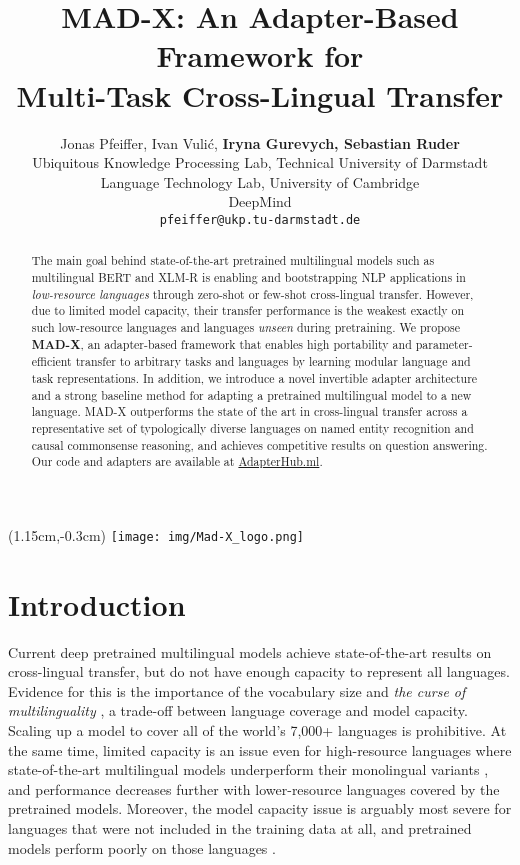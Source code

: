 \documentclass[11pt,a4paper]{article}
\title{MAD-X: An Adapter-Based Framework for\\Multi-Task Cross-Lingual Transfer}
\author{Jonas Pfeiffer, Ivan Vuli\'{c}, {\bf Iryna Gurevych, Sebastian Ruder } \\
Ubiquitous Knowledge Processing Lab, 
  Technical University of Darmstadt \\
Language Technology Lab, University of Cambridge \hspace{0.5em} \\
DeepMind \\
\texttt{pfeiffer@ukp.tu-darmstadt.de} \\
}
\date{}
\newcommand{\model}[1]{\textsc{MAD-X}}
\begin{document}
\maketitle
\begin{abstract}
The main goal behind state-of-the-art pretrained multilingual models such as multilingual BERT and XLM-R is enabling and bootstrapping NLP applications in \textit{low-resource languages} through zero-shot or few-shot cross-lingual transfer. However, due to limited model capacity, their transfer performance is the weakest exactly on such low-resource languages and languages \textit{unseen} during pretraining. We propose \textbf{\model{}}, an adapter-based framework that enables high portability and parameter-efficient transfer to arbitrary tasks and languages by learning modular language and task representations. In addition, we introduce a novel invertible adapter architecture and a strong baseline method for adapting a pretrained multilingual model to a new language. \model{} outperforms the state of the art in cross-lingual transfer across a representative set of typologically diverse languages on named entity recognition and causal commonsense reasoning, and achieves competitive results on question answering. Our code and adapters are available at \href{https://AdapterHub.ml}{AdapterHub.ml}.
\end{abstract}


\begin{textblock*}{4cm}(1.15cm,-0.3cm) \texttt{[image: img/Mad-X\_logo.png]}
\end{textblock*}

\section{Introduction}
\label{s:introduction}
Current deep pretrained multilingual models \cite{Devlin2019bert,Lample2019xlm} achieve state-of-the-art results on cross-lingual transfer, but do not have enough capacity to represent all languages. Evidence for this is the importance of the vocabulary size \cite{Artetxe2020cross-lingual} and \textit{the curse of multilinguality} \cite{Conneau2020xlm-r}, a trade-off between language coverage and model capacity. Scaling up a model to cover all of the world's 7,000+ languages is prohibitive. At the same time, limited capacity is an issue even for high-resource languages where state-of-the-art multilingual models underperform their monolingual variants \cite{Eisenschlos2019multifit,Virtanen:2019arxiv,Nozza:2020arxiv}, and performance decreases further with lower-resource languages covered by the pretrained models. Moreover, the model capacity issue is arguably most severe for languages that were not included in the training data at all, and pretrained models perform poorly on those languages \cite{Ponti2020factorization}.
\end{document}

